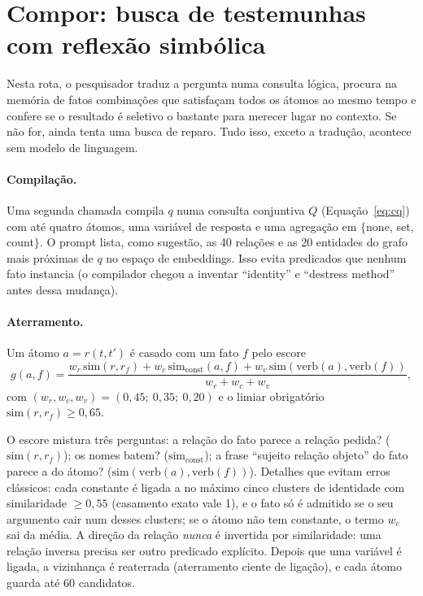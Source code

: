 \documentclass[11pt]{article}
\begin{document}
\section{Compor: busca de testemunhas com reflexão simbólica}\label{sec:compor}

\begin{intuicao}
Nesta rota, o pesquisador traduz a pergunta numa consulta lógica, procura na
memória de fatos combinações que satisfaçam todos os átomos ao mesmo tempo e
confere se o resultado é seletivo o bastante para merecer lugar no contexto.
Se não for, ainda tenta uma busca de reparo. Tudo isso, exceto a tradução,
acontece sem modelo de linguagem.
\end{intuicao}

\paragraph{Compilação.}
Uma segunda chamada compila $q$ numa consulta conjuntiva $Q$
(Equação~\ref{eq:cq}) com até quatro átomos, uma variável de resposta e uma
agregação em $\{$none, set, count$\}$. O prompt lista, como sugestão, as 40
relações e as 20 entidades do grafo mais próximas de $q$ no espaço de
embeddings. Isso evita predicados que nenhum fato instancia (o compilador
chegou a inventar ``identity'' e ``destress method'' antes dessa mudança).

\paragraph{Aterramento.}
Um átomo $a=r(t,t')$ é casado com um fato $f$ pelo escore
\begin{equation}
  g(a,f)=\frac{w_r\,\mathrm{sim}(r,r_f)+w_c\,\mathrm{sim}_{\text{const}}(a,f)
  +w_v\,\mathrm{sim}(\mathrm{verb}(a),\mathrm{verb}(f))}{w_r+w_c+w_v},
  \label{eq:aterramento}
\end{equation}
com $(w_r,w_c,w_v)=(0{,}45;\ 0{,}35;\ 0{,}20)$ e o limiar obrigatório
$\mathrm{sim}(r,r_f)\ge0{,}65$.

\begin{empalavras}
O escore mistura três perguntas: a relação do fato parece a relação pedida?
($\mathrm{sim}(r,r_f)$); os nomes batem? ($\mathrm{sim}_{\text{const}}$); a
frase ``sujeito relação objeto'' do fato parece a do átomo?
($\mathrm{sim}(\mathrm{verb}(a),\mathrm{verb}(f))$). Detalhes que evitam erros
clássicos: cada constante é ligada a no máximo cinco clusters de identidade
com similaridade $\ge0{,}55$ (casamento exato vale 1), e o fato só é admitido
se o seu argumento cair num desses clusters; se o átomo não tem constante, o
termo $w_c$ sai da média. A direção da relação \emph{nunca} é invertida por
similaridade: uma relação inversa precisa ser outro predicado explícito.
Depois que uma variável é ligada, a vizinhança é reaterrada (aterramento
ciente de ligação), e cada átomo guarda até 60 candidatos.
\end{empalavras}
\end{document}
